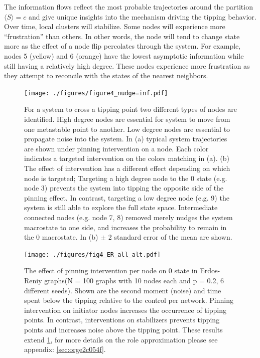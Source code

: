 \documentclass[a4paper, 11pt, twocolumn]{article}
\begin{document}
The information flows reflect the most probable trajectories
around the partition \(\langle S \rangle  = c\) and give unique insights
into the mechanism driving  the tipping behavior. Over time,
local clusters  will stabilize.  Some nodes  will experience
more  ``frustration'' than  others. In  other words,  the node
will tend to change state more  as the effect of a node flip
percolates through the system. For example, nodes 5 (yellow)
and 6 (orange) have  the lowest asymptotic information while
still  having   a  relatively   high  degree.   These  nodes
experience  more frustration  as they  attempt to  reconcile
with the states of the nearest neighbors.

\begin{figure}
\centering
\texttt{[image: ./figures/figure4\_nudge=inf.pdf]}
\caption{\label{fig:kite_noise}For a system to cross a tipping point two different types of nodes are identified. High degree nodes are essential for system to move from one metastable point to another. Low degree nodes are essential to propagate noise into the system. In (a) typical system trajectories are shown under pinning intervention on a node. Each color indicates a targeted intervention on the colors matching in (a). (b) The effect of intervention has a different effect depending on which node is targeted; Targeting a high degree node to the 0 state (e.g. node 3) prevents the system into tipping the opposite side of the pinning effect. In contrast, targeting a low degree node (e.g. 9) the system is still able to explore the full state space. Intermediate connected nodes (e.g. node 7, 8) removed merely nudges the system macrostate to one side, and increases the probability to remain in the 0 macrostate. In (b) \(\pm\) 2 standard error of the mean are shown.}
\end{figure}

\begin{figure}[htbp]
\centering
\texttt{[image: ./figures/fig4\_ER\_all\_alt.pdf]}
\caption{\label{fig:ER}The effect of pinning intervention per node on 0 state  in Erdos-Reniy graphs(N = 100 graphs with 10 nodes each and p = 0.2, 6 different seeds). Shown are the second moment (noise) and time spent below the tipping relative to the control per network. Pinning intervention on initiator nodes increases the occurrence of tipping points. In contrast, interventions on stabilizers prevents tipping points and increases noise above the tipping point.  These results extend \cref{fig:kite_noise}, for more details on the role approximation please see appendix: \ref{sec:orge2c054f}.}
\end{figure}
\end{document}
